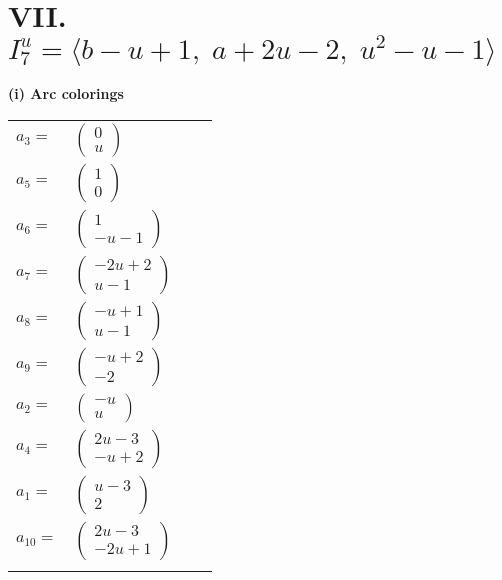 \documentclass[1p]{elsarticle_modified}
\theoremstyle{definition}
\begin{document}
\centering \section*{VII. $I^u_{7}= \langle b- u+1,\;a+2 u-2,\;u^2- u-1 \rangle$}
\flushleft \textbf{(i) Arc colorings}\\
\begin{tabular}{m{7pt} m{180pt} m{7pt} m{180pt} }
\flushright $a_{3}=$&$\begin{pmatrix}0\\u\end{pmatrix}$ \\
\flushright $a_{5}=$&$\begin{pmatrix}1\\0\end{pmatrix}$ \\
\flushright $a_{6}=$&$\begin{pmatrix}1\\- u-1\end{pmatrix}$ \\
\flushright $a_{7}=$&$\begin{pmatrix}-2 u+2\\u-1\end{pmatrix}$ \\
\flushright $a_{8}=$&$\begin{pmatrix}- u+1\\u-1\end{pmatrix}$ \\
\flushright $a_{9}=$&$\begin{pmatrix}- u+2\\-2\end{pmatrix}$ \\
\flushright $a_{2}=$&$\begin{pmatrix}- u\\u\end{pmatrix}$ \\
\flushright $a_{4}=$&$\begin{pmatrix}2 u-3\\- u+2\end{pmatrix}$ \\
\flushright $a_{1}=$&$\begin{pmatrix}u-3\\2\end{pmatrix}$ \\
\flushright $a_{10}=$&$\begin{pmatrix}2 u-3\\-2 u+1\end{pmatrix}$\\&\end{tabular}
\end{document}

